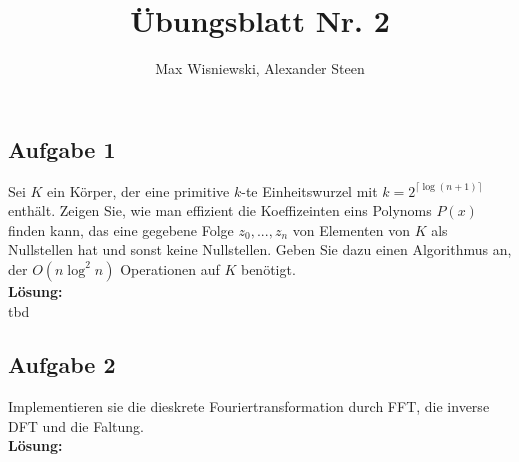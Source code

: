 \documentclass[11pt,a4paper,ngerman]{article}
\date{}
\title{Übungsblatt Nr. 2}
\author{Max Wisniewski, Alexander Steen}
\begin{document}
\renewcommand{\figurename}{Figure}
\maketitle
\thispagestyle{fancy}

\subsection*{Aufgabe 1}

Sei $K$ ein Körper, der eine primitive $k$-te Einheitswurzel mit $k=2^{\lceil \log (n+1) \rceil}$ enthält. Zeigen Sie, wie man effizient die Koeffizeinten eins Polynoms $P(x)$ finden kann, das eine gegebene Folge $z_0,...,z_n$ von Elementen von $K$ als Nullstellen hat und sonst keine Nullstellen. Geben Sie dazu einen Algorithmus an, der $O(n\log^2 n)$ Operationen auf $K$ benötigt.\\

\textbf{Lösung:}\\

tbd


\subsection*{Aufgabe 2}

Implementieren sie die dieskrete Fouriertransformation durch FFT, die inverse DFT und die Faltung.\\

\textbf{Lösung:}\\



\label{LastPage}
\end{document}
